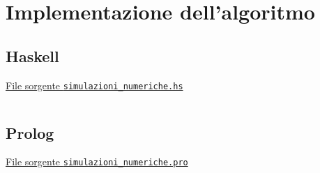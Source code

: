 \section{Implementazione dell'algoritmo}

\subsection{Haskell}
\underline{File sorgente \texttt{simulazioni\_numeriche.hs}} 
\inputminted[linenos,fontsize=\scriptsize, tabsize=4]{haskell}{04_implementazione/simulazioni_numeriche.hs}

\newpage
\subsection{Prolog}
\underline{File sorgente \texttt{simulazioni\_numeriche.pro}}
\inputminted[linenos,fontsize=\scriptsize, tabsize=4]{prolog}{04_implementazione/simulazioni_numeriche.pro}

